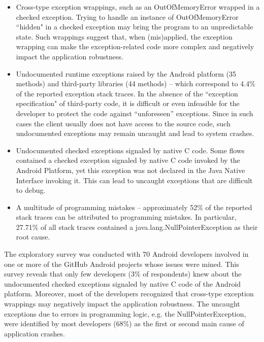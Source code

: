 \begin{itemize}

   \item  Cross-type exception wrappings, such as an OutOfMemoryError wrapped in a checked exception.
Trying to handle an instance of OutOfMemoryError ``hidden" in  a checked exception may bring the program
 to an unpredictable state. Such wrappings suggest that, when (mis)applied, the exception wrapping can make 
the exception-related code more complex and negatively impact the application robustness.

  \item  Undocumented runtime exceptions raised by the Android platform (35 methods) and  third-party libraries (44 methods) --
 which correspond to 4.4\% of the reported exception stack traces.
In the absence of the ``exception specification" of third-party code, it is difficult or 
even infeasible for the developer to protect the code against ``unforeseen'' exceptions. 
Since in such cases the client usually does not have access to the source code, such undocumented 
exceptions may remain uncaught and lead to system crashes. 

   \item Undocumented checked exceptions signaled by native C code.  Some flows contained a checked 
exception signaled by native C code invoked by the Android Platform, yet this exception was not declared
 in the Java Native Interface invoking it. This can lead to uncaught exceptions that are 
difficult to debug. 

 \item A multitude of programming mistakes -- approximately 52\% of the reported stack traces can 
be attributed to programming mistakes. In particular, 27.71\% of all stack traces contained a java.lang.NullPointerException 
as their root cause.

\end{itemize}

The exploratory survey was conducted with 70 Android developers involved in one or more of the 
GitHub Android projects whose issues were mined. This survey reveals that only few developers (3\% of respondents)
 knew about the undocumented checked exceptions signaled by native C code of the Android platform. 
Moreover, most of the developers recognized that cross-type exception wrappings may
negatively impact the application robustness. The uncaught exceptions due to errors in programming 
logic, e.g. the NullPointerException, were identified by most developers (68\%) as the first or second main cause 
of application crashes.

